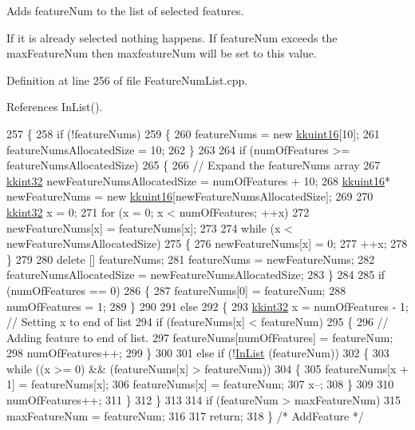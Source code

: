 Adds \textquotesingle{}feature\+Num\textquotesingle{} to the list of selected features. 

If it is already selected nothing happens. If \textquotesingle{}feature\+Num\textquotesingle{} exceeds the max\+Feature\+Num then \textquotesingle{}maxfeature\+Num\textquotesingle{} will be set to this value. 

Definition at line 256 of file Feature\+Num\+List.\+cpp.



References In\+List().


\begin{DoxyCode}
257 \{
258   \textcolor{keywordflow}{if}  (!featureNums)
259   \{
260     featureNums = \textcolor{keyword}{new} \hyperlink{namespace_k_k_b_aa8c7d4d30381c8a0b6fce68974a9c8a9}{kkuint16}[10];
261     featureNumsAllocatedSize = 10;
262   \}
263 
264   \textcolor{keywordflow}{if}  (numOfFeatures >= featureNumsAllocatedSize)
265   \{
266     \textcolor{comment}{// Expand the featureNums array}
267     \hyperlink{namespace_k_k_b_a8fa4952cc84fda1de4bec1fbdd8d5b1b}{kkint32}  newFeatureNumsAllocatedSize = numOfFeatures + 10;
268     \hyperlink{namespace_k_k_b_aa8c7d4d30381c8a0b6fce68974a9c8a9}{kkuint16}*  newFeatureNums = \textcolor{keyword}{new} \hyperlink{namespace_k_k_b_aa8c7d4d30381c8a0b6fce68974a9c8a9}{kkuint16}[newFeatureNumsAllocatedSize];
269 
270     \hyperlink{namespace_k_k_b_a8fa4952cc84fda1de4bec1fbdd8d5b1b}{kkint32} x = 0;
271     \textcolor{keywordflow}{for}  (x = 0;  x < numOfFeatures;  ++x)
272       newFeatureNums[x] = featureNums[x];
273 
274     \textcolor{keywordflow}{while}  (x < newFeatureNumsAllocatedSize)
275     \{
276       newFeatureNums[x] = 0;
277       ++x;
278     \}
279 
280     \textcolor{keyword}{delete}  [] featureNums;
281     featureNums = newFeatureNums;
282     featureNumsAllocatedSize = newFeatureNumsAllocatedSize;
283   \}
284   
285   \textcolor{keywordflow}{if}  (numOfFeatures == 0)
286   \{
287     featureNums[0] = featureNum;
288     numOfFeatures = 1;
289   \}
290 
291   \textcolor{keywordflow}{else}
292   \{
293     \hyperlink{namespace_k_k_b_a8fa4952cc84fda1de4bec1fbdd8d5b1b}{kkint32}  x = numOfFeatures - 1; \textcolor{comment}{// Setting x to end of list}
294     \textcolor{keywordflow}{if}  (featureNums[x] < featureNum)
295     \{
296       \textcolor{comment}{// Adding feature to end of list.}
297       featureNums[numOfFeatures] = featureNum;
298       numOfFeatures++;
299     \}
300 
301     \textcolor{keywordflow}{else} \textcolor{keywordflow}{if}  (!\hyperlink{class_k_k_m_l_l_1_1_feature_num_list_a9fd41e0a953af6698d2e47b35a328095}{InList} (featureNum))
302     \{
303       \textcolor{keywordflow}{while}  ((x >= 0)  &&  (featureNums[x] > featureNum))
304       \{
305         featureNums[x + 1] = featureNums[x];
306         featureNums[x]     = featureNum;
307         x--;
308       \}
309 
310       numOfFeatures++;
311     \}
312   \}
313 
314   \textcolor{keywordflow}{if}  (featureNum > maxFeatureNum)
315     maxFeatureNum = featureNum;
316 
317   \textcolor{keywordflow}{return};
318 \}  \textcolor{comment}{/* AddFeature */}
\end{DoxyCode}
